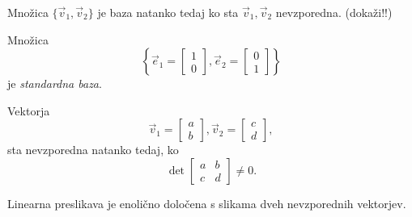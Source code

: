 \documentclass[GmVic, tisk]{gv}
\begin{document}
\begin{trditev} Množica $\{\vec{v}_1, \vec{v}_2 \}$ je baza natanko tedaj ko sta  $\vec{v}_1, \vec{v}_2 $  nevzporedna. (dokaži!!)
\end{trditev}

\begin{definicija} Množica 
$$\left\{ \vec e_1=\begin{bmatrix}
         1\\
         0
      \end{bmatrix},
\vec e_2=\begin{bmatrix}
         0\\
         1
      \end{bmatrix}\right\}
$$
 je {\em standardna baza}.
\end {definicija}

\begin{trditev}Vektorja 
$$\vec{v}_1=
 \begin{bmatrix}
         a\\
         b
      \end{bmatrix},
 \vec{v}_2 = \begin{bmatrix}
         c\\
         d
      \end{bmatrix},$$ 
sta nevzporedna natanko tedaj, ko 
 $$\det \begin{bmatrix}
         a&b\\
         c&d
      \end{bmatrix}\ne 0.$$ 
\end{trditev}

\begin{trditev}Linearna preslikava je enolično določena s slikama dveh nevzporednih vektorjev.
\end{trditev}
\end{document}
